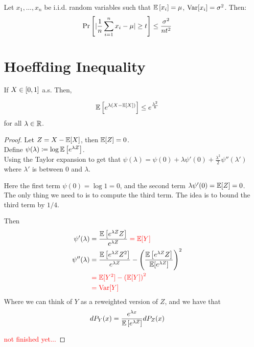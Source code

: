 \begin{corollary}
    Let \(x_1, \ldots, x_n\) be i.i.d. random variables such that \(\mathbb{E}\left[ x_i \right] = \mu\), 
    \(\text{Var}[x_i] = \sigma^2\). Then: 
    \[
        \Pr \left[  \lvert \frac{1}{n}\sum_{i=1}^n x_i - \mu \rvert \geq t \right] \leq \frac{\sigma^2}{nt^2}  
    \]
\end{corollary}


\section{Hoeffding Inequality}

\begin{lemma}
    If \(X \in \left[ 0, 1 \right]\) a.s. Then,  

    \[
        \mathbb{E} \left[ e^{\lambda \left(X - \mathbb{E}[X]\right)} \right] \leq e^{\frac{\lambda^2}{8}}  
    \]
    for all \(\lambda \in \mathbb{R}\). 
\end{lemma}

\begin{proof}
    Let \(Z = X - \mathbb{E}[X]\), then \(\mathbb{E}[Z] = 0\). \\ 
    Define \(\psi(\lambda) \coloneqq \log \mathbb{E} \left[ e^{\lambda Z} \right]\). \\ 
    Using the Taylor expansion to get that \(\psi(\lambda) = \psi (0) + \lambda \psi' (0) + \frac{\lambda^2}{2}\psi''(\lambda')\)
    where \(\lambda'\) is between 0 and \(\lambda\). 

    Here the first term \(\psi(0) = \log 1 = 0\), and the second term \(\lambda \psi'(0) = \mathbb{E}[Z] = 0\). 
    The only thing we need to is to compute the third term. The idea is to bound the third term by \(1/4\). 

    Then 
    \begin{align*}
         \psi'(\lambda) &= \frac{\mathbb{E}\left[ e^{\lambda Z} Z \right]}{e^{\lambda Z}} \color{red} = \mathbb{E} [Y] \\ 
         \psi''(\lambda) &= \frac{\mathbb{E}\left[ e^{\lambda Z} Z^2 \right]}{e^{\lambda Z}} 
         - \left(\frac{\mathbb{E}\left[ e^{\lambda Z}Z \right]}{\mathbb{E} [e^{\lambda Z}]}\right)^2 \\ 
                        & \color{red} = \mathbb{E}[Y^2] - \left(\mathbb{E}[Y]\right)^2 \\ 
                        & \color{red} = \text{Var} [Y]
    \end{align*}
    Where we can think of \(Y\) as a reweighted version of \(Z\), and we have that 
    \[
      dP_Y (x) = \frac{e^{\lambda x}}{\mathbb{E} \left[ e^{\lambda Z} \right]} dP_Z (x)  
    \]

    \textcolor{red}{not finished yet...}
\end{proof}

